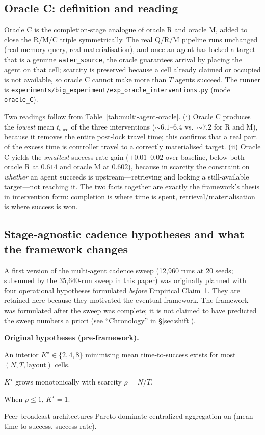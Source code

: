 \documentclass{article}
\newcommand{\method}[1]{\texttt{#1}}
\begin{document}
\subsection{Oracle C: definition and reading}
\label{app:oracle-c-def}

Oracle C is the completion-stage analogue of oracle R and oracle M, added to close the R/M/C triple symmetrically. The real Q/R/M pipeline runs unchanged (real memory query, real materialisation), and once an agent has locked a target that is a genuine \texttt{water\_source}, the oracle guarantees arrival by placing the agent on that cell; scarcity is preserved because a cell already claimed or occupied is not available, so oracle C cannot make more than $T$ agents succeed. The runner is \method{experiments/big\_experiment/exp\_oracle\_interventions.py} (mode \method{oracle\_C}).

Two readings follow from Table~\ref{tab:multi-agent-oracle}. (i) Oracle C produces the \emph{lowest} mean $t_{\mathrm{succ}}$ of the three interventions ($\sim6.1$--$6.4$ vs.\ $\sim7.2$ for R and M), because it removes the entire post-lock travel time; this confirms that a real part of the excess time is controller travel to a correctly materialised target. (ii) Oracle C yields the \emph{smallest} success-rate gain ($+0.01$--$0.02$ over baseline, below both oracle R at $0.614$ and oracle M at $0.602$), because in scarcity the constraint on \emph{whether} an agent succeeds is upstream---retrieving and locking a still-available target---not reaching it. The two facts together are exactly the framework's thesis in intervention form: completion is where time is spent, retrieval/materialisation is where success is won.

\subsection{Stage-agnostic cadence hypotheses and what the framework changes}
\label{app:standalone-hypotheses}

A first version of the multi-agent cadence sweep (12{,}960 runs at 20 seeds; subsumed by the 35{,}640-run sweep in this paper) was originally planned with four operational hypotheses formulated \emph{before} Empirical Claim~1. They are retained here because they motivated the eventual framework. The framework was formulated after the sweep was complete; it is not claimed to have predicted the sweep numbers a priori (see ``Chronology'' in \S\ref{sec:shift}).

\textbf{Original hypotheses (pre-framework).}
\begin{description}[leftmargin=10pt,topsep=2pt,itemsep=1pt]
\item[H1.] An interior $K^\star \in \{2,4,8\}$ minimising mean time-to-success exists for most $(N, T, \text{layout})$ cells.
\item[H2.] $K^\star$ grows monotonically with scarcity $\rho = N/T$.
\item[H3.] When $\rho \le 1$, $K^\star = 1$.
\item[H4.] Peer-broadcast architectures Pareto-dominate centralized aggregation on (mean time-to-success, success rate).
\end{description}
\end{document}
